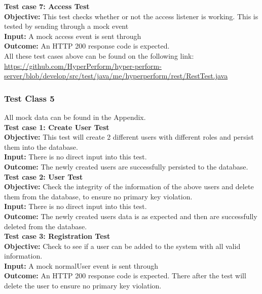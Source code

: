\documentclass[11pt,a4paper]{article}
\begin{document}
\textbf{Test case 7: Access Test}  \\
\textbf{Objective: } This test checks whether or not the access listener is working. This is tested by sending through a mock event \\
\textbf{Input: } A mock access event is sent through \\
\textbf{Outcome: } An HTTP 200 response code is expected. \\

All these test cases above can be found on the following link: \url{https://github.com/HyperPerform/hyper-perform-server/blob/develop/src/test/java/me/hyperperform/rest/RestTest.java}



\pagebreak


\subsubsection{Test Class 5}
All mock data can be found in the Appendix.\\
\textbf{Test case 1: Create User Test} \\
\textbf{Objective: } This test will create 2 different users with different roles and persist them into the database. \\
\textbf{Input: } There is no direct input into this test.\\
\textbf{Outcome: } The newly created users are successfully persisted to the database. \\

\textbf{Test case 2: User Test} \\
\textbf{Objective: } Check the integrity of the information of the above users and delete them from the database, to ensure no primary key violation. \\
\textbf{Input: } There is no direct input into this test.\\
\textbf{Outcome: } The newly created users data is as expected and then are successfully deleted from the database. \\


\textbf{Test case 3: Registration Test} \\
\textbf{Objective: } Check to see if a user can be added to the system with all valid information. \\
\textbf{Input: } A mock normalUser event is sent through\\
\textbf{Outcome: } An HTTP 200 response code is expected. There after the test will delete the user to ensure no primary key violation. \\
\end{document}
